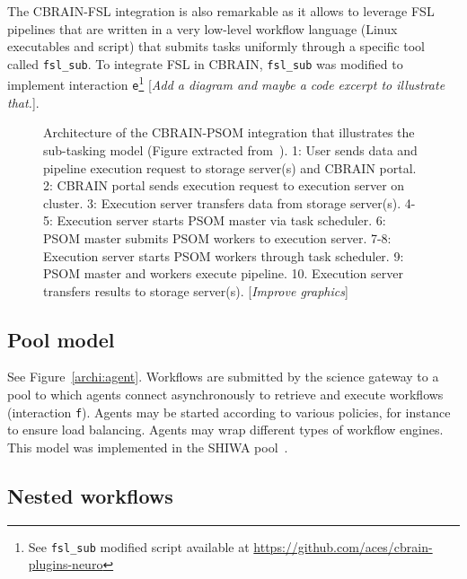 \documentclass[preprint,3p,twocolumn]{elsarticle}
\newcommand{\todo}[1]{\color{blue}\xspace[\emph{#1}]\xspace\color{black}}
\begin{document}
The CBRAIN-FSL integration is also remarkable as it allows to leverage
FSL pipelines that are written in a very low-level workflow language
(Linux executables and script) that submits tasks uniformly through a
specific tool called \texttt{fsl\_sub}. To integrate FSL in CBRAIN,
\texttt{fsl\_sub} was modified to implement interaction
\texttt{e}\footnote{See \texttt{fsl\_sub} modified script available at
  \url{https://github.com/aces/cbrain-plugins-neuro}} \todo{Add a
  diagram and maybe a code excerpt to illustrate that.}.

\begin{figure}
\def\svgwidth{\columnwidth}

\caption{Architecture of the CBRAIN-PSOM integration that illustrates
  the sub-tasking model (Figure extracted from~\cite{GLAT-16}). 1:
  User sends data and pipeline execution request to storage server(s)
  and CBRAIN portal. 2: CBRAIN portal sends execution request to
  execution server on cluster. 3: Execution server transfers data from
  storage server(s). 4-5: Execution server starts PSOM master via task
  scheduler. 6: PSOM master submits PSOM workers to execution
  server. 7-8: Execution server starts PSOM workers through task
  scheduler. 9: PSOM master and workers execute pipeline. 10.
  Execution server transfers results to storage server(s). \todo{Improve graphics}}
\label{fig:cbrain-psom-architecture}
\end{figure}


\subsection{Pool model}
\label{sec:pool}
See Figure~\ref{archi:agent}. Workflows are submitted by the science
gateway to a pool to which agents connect asynchronously to retrieve
and execute workflows (interaction \texttt{f}). Agents may be started
according to various policies, for instance to ensure load
balancing. Agents may wrap different types of workflow engines. This
model was implemented in the SHIWA pool~\cite{ROGE-13}.

\subsection{Nested workflows}
\end{document}
